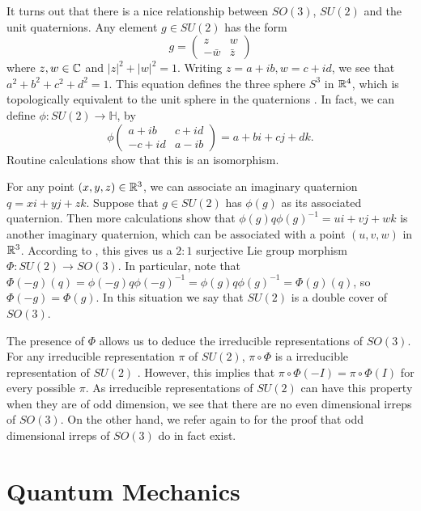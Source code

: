 \documentclass[a4paper]{article}
\begin{document}
It turns out that there is a nice relationship between $SO(3)$, $SU(2)$ and the unit quaternions. Any element $g \in SU(2)$ has the form
$$g = \begin{pmatrix}z & w \\ -\bar{w} & \bar{z}\end{pmatrix}$$
where $z, w \in \mathbb{C}$ and $|z|^2 + |w|^2 = 1$. Writing $z = a + i b, w = c + i d$, we see that $a^2 + b^2 + c^2 + d^2 = 1$. This equation defines the three sphere $S^3$ in $\mathbb{R}^4$, which is topologically equivalent to the unit sphere in the quaternions \cite{wiki}. In fact, we can define $\phi: SU(2) \to \mathbb{H}$, by 
$$\phi\begin{pmatrix}a + i b & c + i d \\ -c + i d & a - i b\end{pmatrix} = a + bi + cj + dk.$$
Routine calculations show that this is an isomorphism. 

For any point $(x, y, z) \in \mathbb{R}^3$, we can associate an imaginary quaternion $q = xi + yj + zk$. Suppose that $g \in SU(2)$ has $\phi(g)$ as its associated quaternion. Then more calculations show that $\phi(g)q\phi(g)^{-1} = u i + v j + w k$ is another imaginary quaternion, which can be associated with a point $(u, v, w)$ in $\mathbb{R}^3$. According to \cite{wiki}, this gives us a $2: 1$ surjective Lie group morphism $\Phi : SU(2) \to SO(3)$. In particular, note that $\Phi(-g)(q) = \phi(-g)q\phi(-g)^{-1} = \phi(g)q\phi(g)^{-1} = \Phi(g)(q)$, so $\Phi(-g) = \Phi(g)$. In this situation we say that $SU(2)$ is a double cover of $SO(3)$.

The presence of $\Phi$ allows us to deduce the irreducible representations of $SO(3)$. For any irreducible representation $\pi$ of $SU(2)$, $\pi \circ \Phi$ is a irreducible representation of $SU(2)$ \cite{woit}. However, this implies that $\pi \circ \Phi(-I) = \pi \circ \Phi(I)$ for every possible $\pi$. As irreducible representations of $SU(2)$ can have this property when they are of odd dimension, we see that there are no even dimensional irreps of $SO(3)$. On the other hand, we refer again to \cite{woit} for the proof that odd dimensional irreps of $SO(3)$ do in fact exist.

\newpage
\section{Quantum Mechanics}
\end{document}
